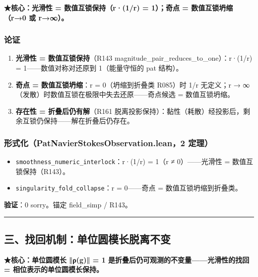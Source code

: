 \documentclass[
]{article}
\providecommand{\tightlist}{%
  \setlength{\itemsep}{0pt}\setlength{\parskip}{0pt}}
\begin{document}
\textbf{★核心：光滑性 = 数值互锁保持（r·(1/r) = 1）；奇点 =
数值互锁坍缩（r→0 或 r→∞）。}

\subsubsection{论证}\label{ux8bbaux8bc1-1}

\begin{enumerate}
\def\labelenumi{\arabic{enumi}.}
\tightlist
\item
  \textbf{光滑性 = 数值互锁保持}（R143
  magnitude\_pair\_reduces\_to\_one）：r·(1/r) = 1------数值对称对还原到
  1（能量守恒的 pat 结构）。
\item
  \textbf{奇点 = 数值互锁坍缩}：r = 0（坍缩到折叠类 R085）时 1/r
  无定义；r → ∞（发散）时数值互锁在极限中失去还原------奇点候选 =
  数值互锁坍缩。
\item
  \textbf{存在性 = 折叠后仍有解}（R161
  脱离投影保持）：黏性（耗散）经投影后，剩余互锁仍保持------解在折叠后仍存在。
\end{enumerate}

\subsubsection{形式化（PatNavierStokesObservation.lean，2
定理）}\label{ux5f62ux5f0fux5316patnavierstokesobservation.lean2-ux5b9aux7406}

\begin{itemize}
\tightlist
\item
  \texttt{smoothness\_numeric\_interlock}：r·(1/r) = 1（r ≠
  0）------光滑性 = 数值互锁保持（R143）。
\item
  \texttt{singularity\_fold\_collapse}：r = 0------奇点 =
  数值互锁坍缩到折叠类。
\end{itemize}

\textbf{验证}：0 sorry。锚定 field\_simp / R143。

\begin{center}\rule{0.5\linewidth}{0.5pt}\end{center}

\subsection{三、找回机制：单位圆模长脱离不变}\label{ux4e09ux627eux56deux673aux5236ux5355ux4f4dux5706ux6a21ux957fux8131ux79bbux4e0dux53d8}

\textbf{★核心：单位圆模长 ‖ρ(g)‖ = 1
是折叠后仍可观测的不变量------光滑性的找回 = 相位表示的单位圆模长保持。}
\end{document}
